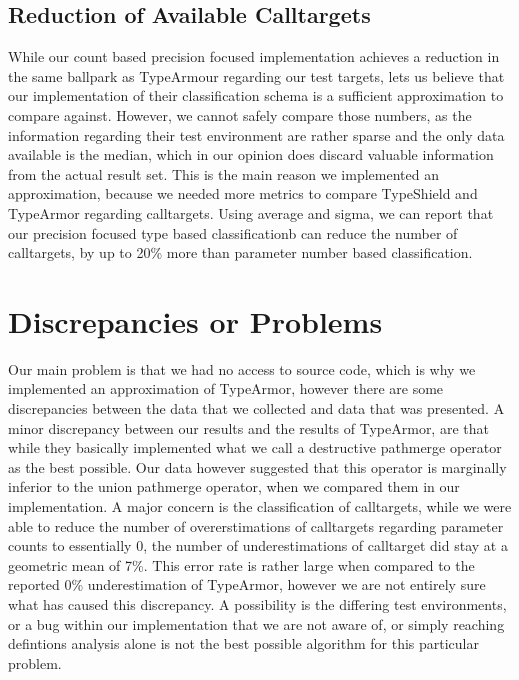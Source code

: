 \subsection{Reduction of Available Calltargets}
While our count based precision focused implementation achieves a reduction in the same ballpark as TypeArmour regarding our test targets, lets us believe that our implementation of their classification schema is a sufficient approximation to compare against. However, we cannot safely compare those numbers, as the information regarding their test environment are rather sparse and the only data available is the median, which in our opinion does discard valuable information from the actual result set. This is the main reason we implemented an approximation, because we needed more metrics to compare TypeShield and TypeArmor regarding calltargets. Using average and sigma, we can report that our precision focused type based classificationb can reduce the number of calltargets, by up to 20\% more than parameter number based classification.


\section{Discrepancies or Problems}
Our main problem is that we had no access to source code, which is why we implemented an approximation of TypeArmor, however there are some discrepancies between the data that we collected and data that was presented.
A minor discrepancy between our results and the results of TypeArmor, are that while they basically implemented what we call a destructive pathmerge operator as the best possible. Our data however suggested that this operator is marginally inferior to the union pathmerge operator, when we compared them in our implementation.
A major concern is the classification of calltargets, while we were able to reduce the number of overerstimations of calltargets regarding parameter counts to essentially 0, the number of underestimations of calltarget did stay at a geometric mean of 7\%. This error rate is rather large when compared to the reported 0\% underestimation of TypeArmor, however we are not entirely sure what has caused this discrepancy. A possibility is the differing test environments, or a bug within our implementation that we are not aware of, or simply reaching defintions analysis alone is not the best possible algorithm for this particular problem.

